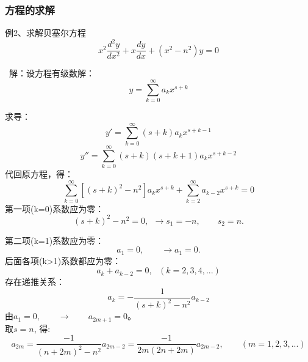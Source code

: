 \begin{frame}
	\frametitle{方程的求解}
	\begin{exampleblock} {例2、求解贝塞尔方程}
		\begin{equation*}
			x^2\frac{d^2y}{dx^2} + x\frac{dy}{dx} +( x^2 -n^2)y=0
		\end{equation*}	
	\end{exampleblock}
	\alert{ 解：}设方程有级数解：
	\begin{equation*}
		y=\sum\limits_{k=0}^{\infty} a_k x^{s+k}
	\end{equation*}	
\end{frame}	

\begin{frame}
	求导：
	\begin{equation*}
		y'=\sum\limits_{k=0}^{\infty} (s+k) a_k x^{s+k-1}
	\end{equation*}	
	\begin{equation*}
		y''=\sum\limits_{k=0}^{\infty} (s+k) (s+k+1) a_k x^{s+k-2}
	\end{equation*}	
	代回原方程，得：
	\begin{equation*}
		\sum\limits_{k=0}^{\infty} [(s+k) ^2 -n^2]  a_k x^{s+k} + \sum\limits_{k=2}^{\infty}  a_{k-2} x^{s+k} =0
	\end{equation*}	
	第一项(k=0)系数应为零：
	\begin{equation*}
		(s+k) ^2 -n^2=0,~~ \to s_1=-n, \qquad s_2=n. 
	\end{equation*}	
\end{frame}	

\begin{frame}
	第二项(k=1)系数应为零：
	\begin{equation*}
		[(s+k) ^2 -n^2] a_1=0,\qquad \to a_1=0. 
	\end{equation*}	
	后面各项(k>1)系数都应为零：
	\begin{equation*}
		[(s+k) ^2 -n^2] a_k+ a_{k-2}=0, ~~~ (k=2,3,4,...)
	\end{equation*}	
	存在递推关系：
	\begin{equation*}
		a_k=-\frac{1}{(s+k) ^2 -n^2 } a_{k-2}
	\end{equation*}	
	由$a_1=0,\qquad \to \qquad a_{2m+1}=0 $。\\
	取$s=n$, 得:
	\begin{equation*}
		a_{2m}=\frac{-1}{(n+2m) ^2 -n^2 } a_{2m-2} =\frac{-1}{2m (2n+2m) } a_{2m-2}, \qquad (m=1,2,3,...)
	\end{equation*}	
\end{frame}	


